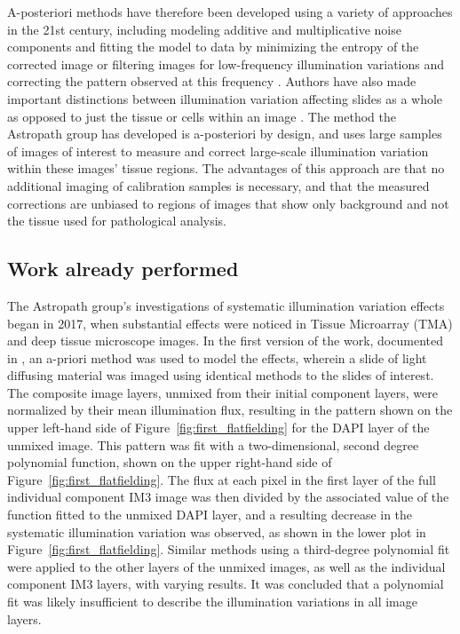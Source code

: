 \documentclass[letterpaper,11pt]{article}
\newcommand{\reffig}[1]{Figure~\ref{#1}}
\begin{document}
A-posteriori methods have therefore been developed using a variety of approaches in the 21st century, including modeling additive and multiplicative noise components and fitting the model to data by minimizing the entropy of the corrected image \cite{PMID:10692132} or filtering images for low-frequency illumination variations and correcting the pattern observed at this frequency \cite{Leong619}. Authors have also made important distinctions between illumination variation affecting slides as a whole as opposed to just the tissue or cells within an image \cite{Carpenter2006}. The method the Astropath group has developed is a-posteriori by design, and uses large samples of images of interest to measure and correct large-scale illumination variation within these images' tissue regions. The advantages of this approach are that no additional imaging of calibration samples is necessary, and that the measured corrections are unbiased to regions of images that show only background and not the tissue used for pathological analysis.

\subsection{Work already performed}
\label{ssec:work_already_performed}

The Astropath group's investigations of systematic illumination variation effects began in 2017, when substantial effects were noticed in Tissue Microarray (TMA) and deep tissue microscope images. In the first version of the work, documented in \cite{Alex_flatfielding_1}, an a-priori method was used to model the effects, wherein a slide of light diffusing material was imaged using identical methods to the slides of interest. The composite image layers, unmixed from their initial component layers, were normalized by their mean illumination flux, resulting in the pattern shown on the upper left-hand side of \reffig{fig:first_flatfielding} for the DAPI layer of the unmixed image. This pattern was fit with a two-dimensional, second degree polynomial function, shown on the upper right-hand side of \reffig{fig:first_flatfielding}. The flux at each pixel in the first layer of the full individual component IM3 image was then divided by the associated value of the function fitted to the unmixed DAPI layer, and a resulting decrease in the systematic illumination variation was observed, as shown in the lower plot in \reffig{fig:first_flatfielding}. Similar methods using a third-degree polynomial fit were applied to the other layers of the unmixed images, as well as the individual component IM3 layers, with varying results. It was concluded that a polynomial fit was likely insufficient to describe the illumination variations in all image layers.
\end{document}
